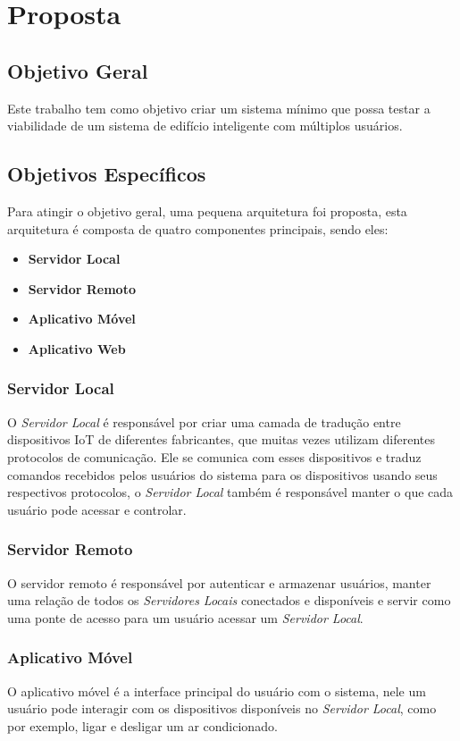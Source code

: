\chapter{Proposta}
\label{sec:proposta}

\section{Objetivo Geral}
Este trabalho tem como objetivo criar um sistema mínimo que possa testar
a viabilidade de um sistema de edifício inteligente com múltiplos usuários.

\section{Objetivos Específicos}
Para atingir o objetivo geral, uma pequena arquitetura foi proposta, esta 
arquitetura é composta de quatro componentes principais, sendo eles:
\begin{itemize}
    \item \textbf{Servidor Local}
    \item \textbf{Servidor Remoto}
    \item \textbf{Aplicativo Móvel}
    \item \textbf{Aplicativo Web}
\end{itemize}

\subsection{Servidor Local} 
O \emph{Servidor Local} é responsável por criar uma
camada de tradução entre dispositivos IoT de diferentes fabricantes, que muitas
vezes utilizam diferentes protocolos de comunicação. Ele se comunica com esses
dispositivos e traduz comandos recebidos pelos usuários do sistema para os dispositivos
usando seus respectivos protocolos, o \emph{Servidor Local} também é responsável manter
o que cada usuário pode acessar e controlar.

\subsection{Servidor Remoto}
O servidor remoto é responsável por autenticar e armazenar usuários, manter uma
relação de todos os \emph{Servidores Locais} conectados e disponíveis e servir como uma
ponte de acesso para um usuário acessar um \emph{Servidor Local}.

\subsection{Aplicativo Móvel}
O aplicativo móvel é a interface principal do usuário com o sistema, nele um usuário pode interagir
com os dispositivos disponíveis no \emph{Servidor Local}, como por exemplo, ligar e desligar um ar condicionado.

